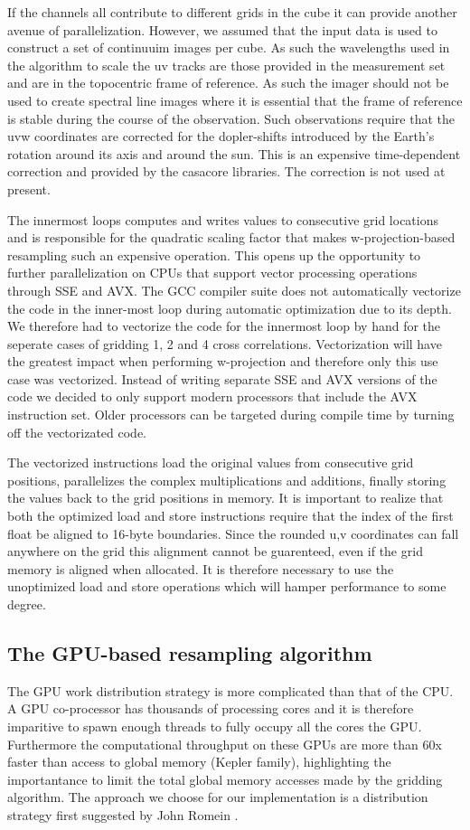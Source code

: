 If the channels all contribute to different grids in the cube it can provide another avenue of parallelization. However, we assumed that the input data is used to
construct a set of continuuim images per cube. As such the wavelengths used in the algorithm to scale the uv tracks are those provided in the measurement set and are in the topocentric
frame of reference. As such the imager should not be used to create spectral line images where it is essential that the frame of reference is stable during the course of the observation.
Such observations require that the uvw coordinates are corrected for the dopler-shifts introduced by the Earth's rotation around its axis and around the sun. This is an expensive time-dependent
correction and provided by the casacore libraries. The correction is not used at present.

The innermost loops computes and writes values to consecutive grid locations and is responsible for the quadratic scaling factor that makes w-projection-based resampling such an expensive operation. 
This opens up the opportunity to further parallelization on CPUs that support vector processing operations through SSE and AVX. The GCC compiler suite does not automatically vectorize the code in the inner-most 
loop during automatic optimization due to its depth. We therefore had to vectorize the code for the innermost loop by hand for the seperate cases of gridding 1, 2 and 4 cross correlations. Vectorization will have
the greatest impact when performing w-projection and therefore only this use case was vectorized. Instead of writing separate SSE and AVX versions of the code we decided to only support modern processors that include the 
AVX instruction set. Older processors can be targeted during compile time by turning off the vectorizated code.

The vectorized instructions load the original values from consecutive grid positions, parallelizes the complex multiplications and additions, finally storing the values back to the grid positions in memory. It is important to
realize that both the optimized load and store instructions require that the index of the first float be aligned to 16-byte boundaries. Since the rounded u,v coordinates can fall anywhere on the grid this alignment cannot be guarenteed,
even if the grid memory is aligned when allocated. It is therefore necessary to use the unoptimized load and store operations which will hamper performance to some degree.

\subsection{The GPU-based resampling algorithm}
The GPU work distribution strategy is more complicated than that of the CPU. A GPU co-processor has thousands of processing cores and it is therefore imparitive to spawn enough threads to fully
occupy all the cores the GPU. Furthermore the computational throughput on these GPUs are more than 60x faster than access to global memory (Kepler family), highlighting the importantance to limit the total global 
memory accesses made by the gridding algorithm. The approach we choose for our implementation is a distribution strategy first
suggested by John Romein \cite{romein2012efficient}.

